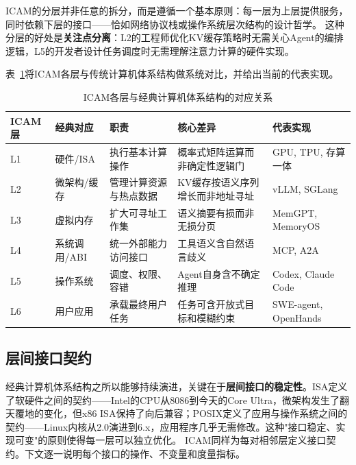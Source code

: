 ICAM的分层并非任意的拆分，而是遵循一个基本原则：每一层为上层提供服务，同时依赖下层的接口——恰如网络协议栈或操作系统层次结构的设计哲学。
这种分层的好处是\textbf{关注点分离}：L2的工程师优化KV缓存策略时无需关心Agent的编排逻辑，L5的开发者设计任务调度时无需理解注意力计算的硬件实现。

表~\ref{tab:icam}将ICAM各层与传统计算机体系结构做系统对比，并给出当前的代表实现。

\begin{table}[t]
\centering
\footnotesize
\caption{ICAM各层与经典计算机体系结构的对应关系}
\label{tab:icam}
\begin{tabularx}{\textwidth}{p{}p{}p{}p{}p{}}
\toprule
ICAM层 & 经典对应 & 职责 & 核心差异 & 代表实现 \\
\midrule
L1 & 硬件/ISA & 执行基本计算操作 & 概率式矩阵运算而非确定性逻辑门 & GPU, TPU, 存算一体\cite{wolters2024computeinmemory} \\
L2 & 微架构/缓存 & 管理计算资源与热点数据 & KV缓存按语义序列增长而非地址寻址 & vLLM, SGLang\cite{kwon2023pagedattention,sglang2024} \\
L3 & 虚拟内存 & 扩大可寻址工作集 & 语义摘要有损而非无损分页 & MemGPT, MemoryOS\cite{memgpt2023,memoryos2025} \\
L4 & 系统调用/ABI & 统一外部能力访问接口 & 工具语义含自然语言歧义 & MCP, A2A\cite{mcp_intro_2026,agentprotocols2025} \\
L5 & 操作系统 & 调度、权限、容错 & Agent自身含不确定推理 & Codex, Claude Code\cite{openai_codex_overview_2026,anthropic_claudecode_overview_2026} \\
L6 & 用户应用 & 承载最终用户任务 & 任务可含开放式目标和模糊约束 & SWE-agent, OpenHands\cite{sweagent2024,openhands_paper_2025} \\
\bottomrule
\end{tabularx}
\end{table}

\subsection{层间接口契约}
\label{sec:icam-interfaces}

经典计算机体系结构之所以能够持续演进，关键在于\textbf{层间接口的稳定性}。ISA定义了软硬件之间的契约——Intel的CPU从8086到今天的Core Ultra，微架构发生了翻天覆地的变化，但x86 ISA保持了向后兼容；POSIX定义了应用与操作系统之间的契约——Linux内核从2.0演进到6.x，应用程序几乎无需修改。这种"接口稳定、实现可变"的原则使得每一层可以独立优化。
ICAM同样为每对相邻层定义接口契约。下文逐一说明每个接口的操作、不变量和度量指标。

